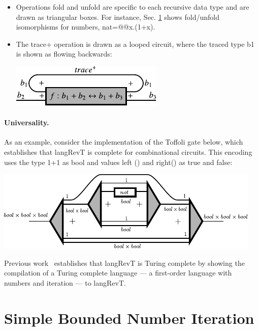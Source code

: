 \documentclass{llncs}
\begin{document}
\begin{itemize}
\item Operations {{fold}} and {{unfold}} are specific to each recursive
  data type and are drawn as triangular boxes. For instance,
  Sec. \ref{sec:bounded} shows {{fold}}/{{unfold}} isomorphisms for
  numbers, {{nat=@@x.(1+x)}}.

\item The {{trace+}} operation is drawn as a looped circuit, where the
  traced type {{b1}} is shown as flowing backwards:

\begin{center}
  \includegraphics{diagrams/thesis/trace_plus.pdf}
\end{center}

\end{itemize}

\paragraph*{Universality.} 
As an example, consider the implementation of the Toffoli gate below, which
establishes that {{langRevT}} is complete for combinational circuits. This
encoding uses the type {{1+1}} as {{bool}} and values {{left ()}} and
{{right()}} as {{true}} and {{false}}:
\begin{center}
  \includegraphics{diagrams/toffoli.pdf}
\end{center}
\noindent Previous work~\cite[Sec.~5]{James:2012:IE:2103656.2103667}
establishes that {{langRevT}} is Turing complete by showing the compilation
of a Turing complete language --- a first-order language with numbers and
iteration --- to {{langRevT}}.

\section{Simple Bounded Number Iteration}
\label{sec:bounded}
\end{document}
